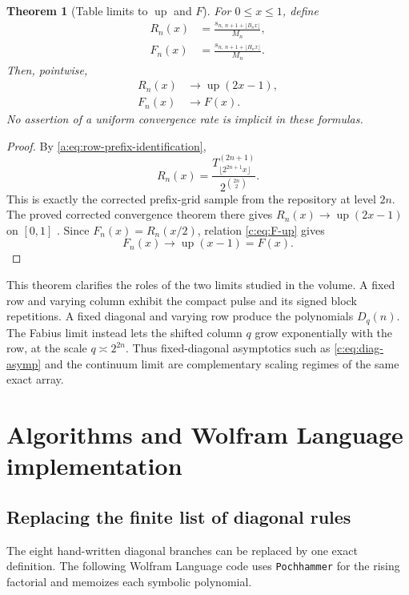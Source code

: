 \documentclass[11pt,a4paper,oneside,openany]{book}
\numberwithin{equation}{chapter}
\newtheorem{theorem}{Theorem}[chapter]
\theoremstyle{definition}
\theoremstyle{remark}
\newcommand{\Diag}{D}
\newcommand{\Up}{\operatorname{up}}
\begin{document}
\begin{theorem}[Table limits to \(\Up\) and \(F\)]
\label{c:thm:table-fabius-limit}
For \(0\leq x\leq1\), define
\begin{align}
 R_n(x)&=\frac{s_{n,\,n+1+\lfloor B_nx\rfloor}}{M_n},      \label{c:eq:Rn}\\
 F_n(x)&=\frac{s_{n,\,n+1+\lfloor H_nx\rfloor}}{M_n}.      \label{c:eq:Fn}
\end{align}
Then, pointwise,
\begin{align}
 R_n(x)&\longrightarrow \Up(2x-1),                        \label{c:eq:Rn-limit}\\
 F_n(x)&\longrightarrow F(x).                             \label{c:eq:Fn-limit}
\end{align}
No assertion of a uniform convergence rate is implicit in these formulas.
\end{theorem}

\begin{proof}
By \cref{a:eq:row-prefix-identification},
\[
 R_n(x)=
 \frac{T_{\lfloor2^{2n+1}x\rfloor}^{(2n+1)}}
      {2^{\binom{2n}{2}}}.
\]
This is exactly the corrected prefix-grid sample from the repository at
level \(2n\).  The proved corrected convergence theorem there gives
\(R_n(x)\to\Up(2x-1)\) on \([0,1]\) \cite{proveit}.  Since
\(F_n(x)=R_n(x/2)\), relation \cref{c:eq:F-up} gives
\[
 F_n(x)\longrightarrow \Up(x-1)=F(x).
\]
\end{proof}

This theorem clarifies the roles of the two limits studied in the volume.
A fixed row and varying column exhibit the compact pulse and its signed
block repetitions.  A fixed diagonal and varying row produce the
polynomials \(\Diag_q(n)\).  The Fabius limit instead lets the shifted
column \(q\) grow exponentially with the row, at the scale
\(q\asymp2^{2n}\).  Thus fixed-diagonal asymptotics such as
\cref{c:eq:diag-asymp} and the continuum limit are complementary scaling
regimes of the same exact array.
\chapter{Algorithms and Wolfram Language implementation}\label{ch:algorithms}

\section{Replacing the finite list of diagonal rules}

The eight hand-written diagonal branches can be replaced by one exact
definition.  The following Wolfram Language code uses \texttt{Pochhammer} for
the rising factorial and memoizes each symbolic polynomial.
\end{document}

